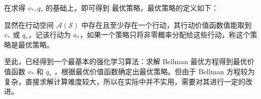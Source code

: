 
在求得 $v_*,q_*$ 的基础上，即可得到{ 最优策略}，最优策略的定义如下：

\begin{definition}
    显然在行动空间 $\mathcal{A}(\mathcal{S})$ 中存在且至少存在一个行动，其行动价值函数值能取到 $v_*$ 或 $q_*$，记该行动为 $a_*$，如果一个策略只将非零概率分配给这些行动，称这个策略是最优策略。
\end{definition}

至此，已经得到一个最基本的强化学习算法：求解 Bellman 最优方程得到最优价值函数 $v_*$ 和 $q_*$ ，根据最优价值函数确定出最优策略。但由于 Bellman 方程较为复杂，直接求解计算难度较大，所以在实际中并不实用，需要对其进行一定的改进。










